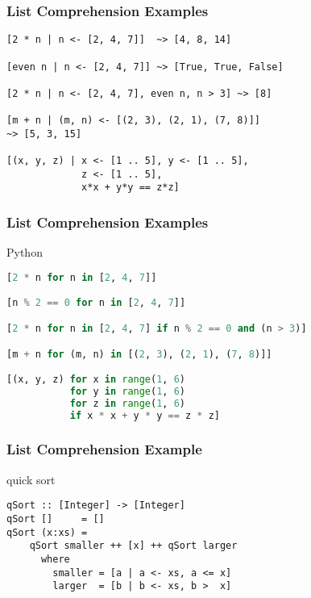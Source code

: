 \documentclass[dvipsnames]{beamer}
\theoremstyle{plain}
\begin{document}
\begin{frame}[fragile]
  \frametitle{List Comprehension Examples}

  \begin{exampleblock}{}
    \begin{lstlisting}
[2 * n | n <- [2, 4, 7]]  ~> [4, 8, 14]

[even n | n <- [2, 4, 7]] ~> [True, True, False]

[2 * n | n <- [2, 4, 7], even n, n > 3] ~> [8]

[m + n | (m, n) <- [(2, 3), (2, 1), (7, 8)]]
~> [5, 3, 15]

[(x, y, z) | x <- [1 .. 5], y <- [1 .. 5],
             z <- [1 .. 5],
             x*x + y*y == z*z]
    \end{lstlisting}
  \end{exampleblock}
\end{frame}

\begin{frame}[fragile]
  \frametitle{List Comprehension Examples}

  \begin{exampleblock}{Python}
    \begin{lstlisting}[language=Python]
[2 * n for n in [2, 4, 7]]

[n % 2 == 0 for n in [2, 4, 7]]

[2 * n for n in [2, 4, 7] if n % 2 == 0 and (n > 3)]

[m + n for (m, n) in [(2, 3), (2, 1), (7, 8)]]

[(x, y, z) for x in range(1, 6)
           for y in range(1, 6)
           for z in range(1, 6)
           if x * x + y * y == z * z]
    \end{lstlisting}
  \end{exampleblock}
\end{frame}

\begin{frame}[fragile]
  \frametitle{List Comprehension Example}

  \begin{exampleblock}{quick sort}
    \begin{lstlisting}
qSort :: [Integer] -> [Integer]
qSort []     = []
qSort (x:xs) =
    qSort smaller ++ [x] ++ qSort larger
      where
        smaller = [a | a <- xs, a <= x]
        larger  = [b | b <- xs, b >  x]
    \end{lstlisting}
  \end{exampleblock}
\end{frame}
\end{document}
